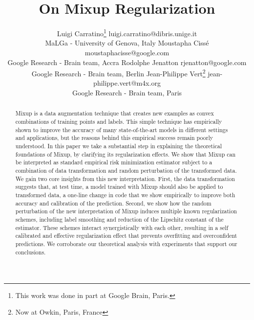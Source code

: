 \documentclass[twoside,11pt]{article}
\begin{document}
\title{On Mixup Regularization}

\author{\name Luigi Carratino\thanks{This work was done in part at Google Brain, Paris.} \email luigi.carratino@dibris.unige.it \\
       \addr MaLGa - University of Genova, Italy
       \AND
       \name Moustapha Ciss\'e \email moustaphacisse@google.com \\
       \addr Google Research - Brain team, Accra
       \AND
       \name Rodolphe Jenatton \email rjenatton@google.com \\
       \addr Google Research - Brain team, Berlin
       \AND
       \name Jean-Philippe Vert\thanks{Now at Owkin, Paris, France} \email jean-philippe.vert@m4x.org \\
       \addr Google Research - Brain team, Paris
       }



\maketitle

\begin{abstract}Mixup is a data augmentation technique that creates new examples as convex combinations of training points and labels. 
  This simple technique has empirically shown to improve the accuracy of many state-of-the-art models in different settings and 
  applications, but the reasons behind this empirical success remain poorly understood. 
  In this paper we take a substantial step in explaining the theoretical foundations of Mixup, 
  by clarifying its regularization effects. 
  We show that Mixup can be interpreted as standard empirical risk minimization estimator subject to 
  a combination of data transformation and random perturbation of the transformed data. 
  We gain two core insights from this new interpretation.
  First, the data transformation suggests that, at test time, a model trained with Mixup should also be applied to transformed data, a one-line change in code that we show empirically to improve both accuracy and calibration of the prediction.
  Second, we show how the random perturbation of the new interpretation of Mixup
  induces multiple known regularization schemes, 
  including label smoothing and reduction of the Lipschitz constant of the estimator. 
  These schemes interact synergistically with each other, 
  resulting in a self calibrated and effective regularization effect that prevents overfitting 
  and overconfident predictions. 
  We corroborate our theoretical analysis with experiments that support our conclusions.
\end{abstract}
\end{document}
